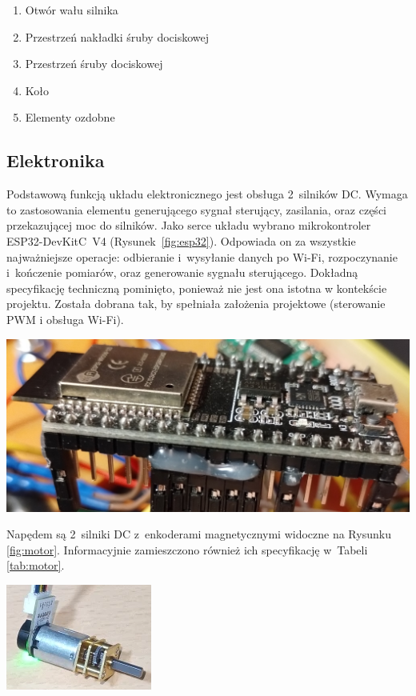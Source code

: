 \begin{enumerate}
    \item Otwór wału silnika
    \item Przestrzeń nakładki śruby dociskowej
    \item Przestrzeń śruby dociskowej
    \item Koło
    \item Elementy ozdobne
\end{enumerate}

\subsection*{Elektronika}
Podstawową funkcją układu elektronicznego jest obsługa 2~silników DC. Wymaga to zastosowania elementu generującego sygnał sterujący, zasilania, oraz części przekazującej moc do silników. Jako serce układu wybrano mikrokontroler ESP32-DevKitC~V4 (Rysunek~\ref{fig:esp32}). Odpowiada on za wszystkie najważniejsze operacje: odbieranie i~wysyłanie danych po Wi-Fi, rozpoczynanie i~kończenie pomiarów, oraz generowanie sygnału sterującego. Dokładną specyfikację techniczną pominięto, ponieważ nie jest ona istotna w kontekście projektu. Została dobrana tak, by spełniała założenia projektowe (sterowanie PWM i obsługa Wi-Fi).

\begin{center}
    \includegraphics[scale=0.08]{images/ESP32.jpg}
    \label{fig:esp32}
\end{center}

Napędem są 2~silniki DC z~enkoderami magnetycznymi widoczne na Rysunku \ref{fig:motor}. Informacyjnie zamieszczono również ich specyfikację w~Tabeli \ref{tab:motor}.

\begin{center}
    \includegraphics[scale=1]{images/Silnik.png}
    \label{fig:motor}
\end{center}

